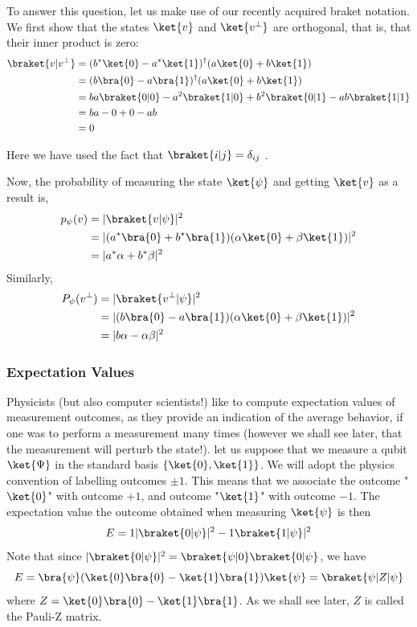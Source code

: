 \documentclass[12pt, oneside]{book}
\theoremstyle{definition}
\theoremstyle{definition}
\theoremstyle{remark}
\begin{document}
To answer this question, let us make use of our recently acquired braket notation. We first show that the states $\ket{v}$ and $\ket{v^{\perp}}$ are orthogonal, that is, that their inner product is zero:
\begin{align*}
\braket{v|v^{\perp}}&=(b^*\ket{0}-a^*\ket{1})^{\dagger}(a\ket{0}+b\ket{1})\\
&=(b\bra{0}-a\bra{1})^{\dagger}(a\ket{0}+b\ket{1})\\
&=ba\braket{0|0}-a^2\braket{1|0}+b^2\braket{0|1}-ab\braket{1|1}\\
&=ba-0+0-ab\\
&=0
\end{align*}

Here we have used the fact that $\braket{i|j}=\delta_{ij}$ .

Now, the probability of measuring the state $\ket{\psi}$ and getting $\ket{v}$ as a
result is,
\begin{align*}
p_{\psi}(v)&=|\braket{v|\psi}|^2\\
&=|(a^*\bra{0}+b^*\bra{1})(\alpha\ket{0}+\beta\ket{1})|^2\\
&=|a^*\alpha+b^*\beta|^2
\end{align*}
Similarly,
\begin{align*}
P_{\psi}(v^{\perp})&=|\braket{v^{\perp}|\psi}|^2\\
&=|(b\bra{0}-a\bra{1})(\alpha\ket{0}+\beta\ket{1})|^2\\
&=|b\alpha-\alpha\beta|^2
\end{align*}

\subsubsection{Expectation Values}
Physicists (but also computer scientists!) like to compute expectation values of measurement outcomes, as they provide an indication of the average behavior, if one was to perform a measurement many times (however we shall see later, that the measurement will perturb the state!). let us suppose that we measure a qubit $\ket{\Psi}$ in the standard basis $\{\ket{0},\ket{1}\}$. We will adopt the physics convention of labelling outcomes $\pm1$. This means that we associate the outcome "$\ket{0}$" with outcome $+1$, and outcome "$\ket{1}$" with outcome $-1$. The expectation value the outcome obtained when measuring $\ket{\psi}$ is then
\[
E=1|\braket{0|\psi}|^2-1\braket{1|\psi}|^2
\]
Note that since $|\braket{0|\psi}|^2=\braket{\psi|0}\braket{0|\psi}$, we have
\[
E=\bra{\psi}(\ket{0}\bra{0}-\ket{1}\bra{1})\ket{\psi}=\braket{\psi|Z|\psi}
\]
where $Z=\ket{0}\bra{0}-\ket{1}\bra{1}$.  As we shall see later, $Z$ is called the Pauli-Z matrix.
\end{document}
